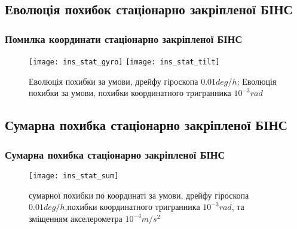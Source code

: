 \documentclass[ucs,compress]{beamer}    %
\begin{document}
\subsection{Еволюція похибок стаціонарно закріпленої БІНС} 
\begin{frame}
\frametitle{Помилка координати стаціонарно закріпленої БІНС}

\begin{figure}[l]
\texttt{[image: ins\_stat\_gyro]}
\texttt{[image: ins\_stat\_tilt]}
\caption{\tiny Еволюція похибки за умови, дрейфу гіроскопа $0.01 deg/h$; Еволюція похибки за умови, похибки координатного тригранника $10^{-3} rad$}
\label{fig:sdins2}
\end{figure}
\end{frame}

\subsection{Сумарна похибка стаціонарно закріпленої БІНС} 
\begin{frame}[plain]
\frametitle{Сумарна похибка стаціонарно закріпленої БІНС}
\begin{figure}[l]
\texttt{[image: ins\_stat\_sum]}
\caption{ сумарної похибки по координаті за умови,
дрейфу гіроскопа   $0.01 deg/h$,похибки координатного тригранника $10^{-3} rad$, та зміщенням акселерометра $10^{-4} m/s^2$}
\label{fig:sdins2}
\end{figure}
\end{frame}

\end{document}
